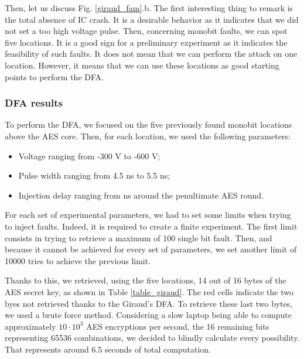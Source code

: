 			Then, let us discuss Fig. \ref{giraud_fam}.b.
			The first interesting thing to remark is the total absence of IC crash.
			It is a desirable behavior as it indicates that we did not set a too high voltage pulse.
			Then, concerning monobit faults, we can spot five locations.
			It is a good sign for a preliminary experiment as it indicates the feasibility of such faults.
			It does not mean that we can perform the attack on one location.
			However, it means that we can use these locations as good starting points to perform the DFA.

		\subsubsection{DFA results}
			To perform the DFA, we focused on the five previously found monobit locations above the AES core.
			Then, for each location, we used the following parameters:
			\begin{itemize}
				\item Voltage ranging from -300 V to -600 V;
				\item Pulse width ranging from 4.5 ns to 5.5 ns;
				\item Injection delay ranging from  ns around the penultimate AES round.
			\end{itemize}
			For each set of experimental parameters, we had to set some limits when trying to inject faults.
			Indeed, it is required to create a finite experiment.
			The first limit consists in trying to retrieve a maximum of 100 single bit fault.
			Then, and because it cannot be achieved for every set of parameters, we set another limit of 10000 tries to achieve the previous limit.
			
			Thanks to this, we retrieved, using the five locations, 14 out of 16 bytes of the AES secret key, as shown in Table \ref{table_giraud}.
			The red cells indicate the two byes not retrieved thanks to the Giraud's DFA.
			To retrieve these last two bytes, we used a brute force method.
			Considering a slow laptop being able to compute approximately $10 \cdot 10^3$ AES encryptions per second, the 16 remaining bits representing 65536 combinations, we decided to blindly calculate every possibility.
			That represents around 6.5 seconds of total computation.

